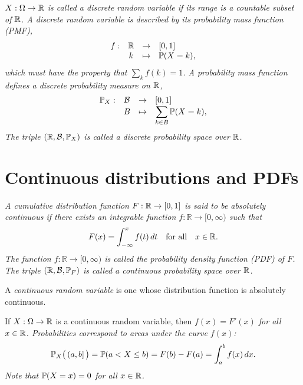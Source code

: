 \begin{definition}
\bit
\it $X:\Omega\to\mathbb{R}$ is called a \emph{discrete random variable} if its range is a countable subset of $\mathbb{R}$. 
\it A discrete random variable is described by its \emph{probability mass function} (PMF),
\[
\begin{array}{rccl}
	f:	& \mathbb{R}		& \to 		& [0,1] \\
		& k		& \mapsto 	& \mathbb{P} (X=k),
\end{array}
\]
which must have the property that $\sum_k f(k) = 1$.
\it A probability mass function defines a \emph{discrete probability measure} on $\mathbb{R}$,
\[
\begin{array}{rccl}
	\mathbb{P}_X:	& \mathcal{B}	& \to 		& [0,1] \\
			& B					& \mapsto 	& \displaystyle\sum_{k\in B} \mathbb{P}(X=k),
\end{array}
\]
\it The triple $(\mathbb{R},\mathcal{B},\mathbb{P}_X)$ is called a \emph{discrete probability space} over $\mathbb{R}$.
\eit

\end{definition}

\section{Continuous distributions and PDFs}
\begin{definition}\label{def:abs_cts_cdf}
\bit
\it
A cumulative distribution function $F:\mathbb{R}\to[0,1]$ is said to be \emph{absolutely continuous} if there exists an integrable function $f:\mathbb{R}\to [0,\infty)$ such that 
\[
F(x) = \int_{-\infty}^x f(t)\,dt \text{\quad for all\quad} x\in\mathbb{R}.
\]
\it
The function $f:\mathbb{R}\to [0,\infty)$ is called the \emph{probability density function} (PDF) of $F$.
\it 
The triple $(\mathbb{R},\mathcal{B},\mathbb{P}_F)$ is called a \emph{continuous probability space} over $\mathbb{R}$.
\eit
\end{definition}

\begin{definition}
A \emph{continuous random variable} is one whose distribution function is absolutely continuous.
\end{definition}

If $X:\Omega\to\mathbb{R}$ is a continuous random variable, then
\bit
\it $f(x) = F'(x)$ for all $x\in\mathbb{R}$.
\it Probabilities correspond to areas under the curve $f(x)$: 
\[
\mathbb{P}_X\big(\,(a,b]\,\big) = \mathbb{P}(a< X\leq b) = F(b) - F(a) = \int_a^b f(x)\,dx.
\]
\it Note that $\mathbb{P}(X=x)=0$ for all $x\in\mathbb{R}$.
\eit

